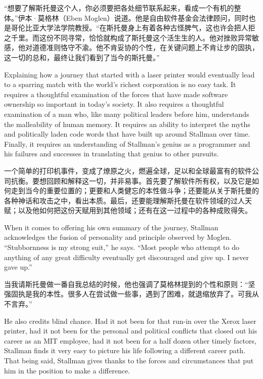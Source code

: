 \ifdefined\chs
``想要了解斯托曼这个人，你必须要把各处细节联系起来，看成一个有机的整体。''伊本·莫格林（Eben Moglen）说道。他是自由软件基金会法律顾问，同时也是哥伦比亚大学法学院教授。``在斯托曼身上有着各种古怪脾气，这也许会把人拒之千里。而这份不同寻常，恰恰就构成了斯托曼这个活生生的人。他对挫败异常敏感，他对道德准则恪守不渝。他不肯妥协的个性，在关键问题上不肯让步的固执，这一切的总和，最终让我们看到了当今的斯托曼。''
\fi

\ifdefined\eng
Explaining how a journey that started with a laser printer would eventually lead to a sparring match with the world's richest corporation is no easy task. It requires a thoughtful examination of the forces that have made software ownership so important in today's society. It also requires a thoughtful examination of a man who, like many political leaders before him, understands the malleability of human memory. It requires an ability to interpret the myths and politically laden code words that have built up around Stallman over time. Finally, it requires an understanding of Stallman's genius as a programmer and his failures and successes in translating that genius to other pursuits.
\fi

\ifdefined\chs
一个简单的打印机事件，变成了燎原之火，燃遍全球，足以和全球最富有的软件公司抗衡。要想回顾和解释这一切，并非易事。首先要了解软件所有权，以及它是如何走到当今的重要位置的；更要和人类健忘的本性做斗争；还要能从关于斯托曼的各种神话和攻击之中，看出本质。最后，还要能理解斯托曼在软件领域的过人天赋；以及他如何把这份天赋用到其他领域；还有在这一过程中的各种成败得失。
\fi

\ifdefined\eng
When it comes to offering his own summary of the journey, Stallman acknowledges the fusion of personality and principle observed by Moglen. ``Stubbornness is my strong suit,'' he says. ``Most people who attempt to do anything of any great difficulty eventually get discouraged and give up. I never gave up.''
\fi

\ifdefined\chs
当我请斯托曼做一番自我总结的时候，他也强调了莫格林提到的个性和原则：``坚强固执是我的本性。很多人在尝试做一些事，遇到了困难，就退缩放弃了。可我从不言弃。''
\fi

\ifdefined\eng
He also credits blind chance. Had it not been for that run-in over the Xerox laser printer, had it not been for the personal and political conflicts that closed out his career as an MIT employee, had it not been for a half dozen other timely factors, Stallman finds it very easy to picture his life following a different career path. That being said, Stallman gives thanks to the forces and circumstances that put him in the position to make a difference.
\fi

